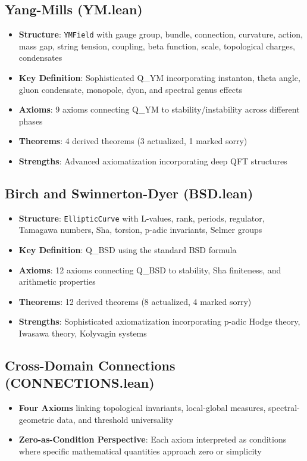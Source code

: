 \documentclass[11pt]{article}
\begin{document}
\subsection{Yang-Mills (YM.lean)}
\begin{itemize}
\item \textbf{Structure}: \texttt{YMField} with gauge group, bundle, connection, curvature, action, mass gap, string tension, coupling, beta function, scale, topological charges, condensates
\item \textbf{Key Definition}: Sophisticated Q\_YM incorporating instanton, theta angle, gluon condensate, monopole, dyon, and spectral genus effects
\item \textbf{Axioms}: 9 axioms connecting Q\_YM to stability/instability across different phases
\item \textbf{Theorems}: 4 derived theorems (3 actualized, 1 marked sorry)
\item \textbf{Strengths}: Advanced axiomatization incorporating deep QFT structures
\end{itemize}

\subsection{Birch and Swinnerton-Dyer (BSD.lean)}
\begin{itemize}
\item \textbf{Structure}: \texttt{EllipticCurve} with L-values, rank, periods, regulator, Tamagawa numbers, Sha, torsion, p-adic invariants, Selmer groups
\item \textbf{Key Definition}: Q\_BSD using the standard BSD formula
\item \textbf{Axioms}: 12 axioms connecting Q\_BSD to stability, Sha finiteness, and arithmetic properties
\item \textbf{Theorems}: 12 derived theorems (8 actualized, 4 marked sorry)
\item \textbf{Strengths}: Sophisticated axiomatization incorporating p-adic Hodge theory, Iwasawa theory, Kolyvagin systems
\end{itemize}

\subsection{Cross-Domain Connections (CONNECTIONS.lean)}
\begin{itemize}
\item \textbf{Four Axioms} linking topological invariants, local-global measures, spectral-geometric data, and threshold universality
\item \textbf{Zero-as-Condition Perspective}: Each axiom interpreted as conditions where specific mathematical quantities approach zero or simplicity
\end{itemize}
\end{document}
